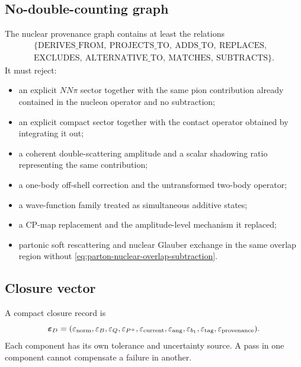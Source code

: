\documentclass[11pt]{article}
\newcommand{\eps}{\varepsilon}
\newcommand{\tagg}{\mathrm{tag}}
\begin{document}
\subsection{No-double-counting graph}

The nuclear provenance graph contains at least the relations
\begin{equation}
\begin{gathered}
 \{\mathrm{DERIVES\_FROM},\ \mathrm{PROJECTS\_TO},\
   \mathrm{ADDS\_TO},\ \mathrm{REPLACES},\\
   \mathrm{EXCLUDES},\ \mathrm{ALTERNATIVE\_TO},\
   \mathrm{MATCHES},\ \mathrm{SUBTRACTS}\}.
\end{gathered}
\label{eq:nuclear-provenance-relations}
\end{equation}
It must reject:
\begin{itemize}
\item an explicit \(NN\pi\) sector together with the same pion contribution
      already contained in the nucleon operator and no subtraction;
\item an explicit compact sector together with the contact operator obtained
      by integrating it out;
\item a coherent double-scattering amplitude and a scalar shadowing ratio
      representing the same contribution;
\item a one-body off-shell correction and the untransformed two-body operator;
\item a wave-function family treated as simultaneous additive states;
\item a CP-map replacement and the amplitude-level mechanism it replaced;
\item partonic soft rescattering and nuclear Glauber exchange in the same
      overlap region without \cref{eq:parton-nuclear-overlap-subtraction}.
\end{itemize}

\subsection{Closure vector}

A compact closure record is
\begin{equation}
 \bm\eps_D=
 (\eps_{\rm norm},\eps_B,\eps_Q,\eps_{P^+},
 \eps_{\rm current},\eps_{\rm ang},
 \eps_{b_1},\eps_{\tagg},\eps_{\rm provenance}).
\label{eq:nuclear-closure-vector}
\end{equation}
Each component has its own tolerance and uncertainty source.  A pass in one
component cannot compensate a failure in another.
\end{document}
